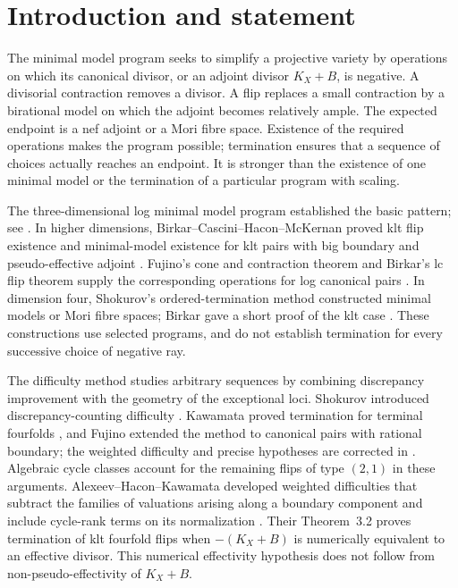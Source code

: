 \section{Introduction and statement}
\label{sec:introduction}

The minimal model program seeks to simplify a projective variety by operations
on which its canonical divisor, or an adjoint divisor $K_X+B$, is negative.
A divisorial contraction removes a divisor. A flip replaces a small
contraction by a birational model on which the adjoint becomes relatively
ample. The expected endpoint is a nef adjoint or a Mori fibre space.
Existence of the required operations makes the program possible;
termination ensures that a sequence of choices actually reaches an endpoint.
It is stronger than the existence of one minimal model or the termination
of a particular program with scaling.

The three-dimensional log minimal model program established the basic
pattern; see \cite{KollarEtAl1992,KM98}. In higher dimensions,
Birkar--Cascini--Hacon--McKernan proved klt flip existence and
minimal-model existence for klt pairs with big boundary and
pseudo-effective adjoint \cite{BCHM}.
Fujino's cone and contraction theorem and Birkar's lc flip theorem
supply the corresponding operations for log canonical pairs
\cite{FujinoFoundations,BirkarLC}. In dimension four, Shokurov's
ordered-termination method constructed minimal models or Mori fibre
spaces; Birkar gave a short proof of the klt case
\cite{ShokurovOrdered,BirkarShokurov}. These constructions use
selected programs, and do not establish termination for every
successive choice of negative ray.

The difficulty method studies arbitrary sequences by combining
discrepancy improvement with the geometry of the exceptional loci.
Shokurov introduced discrepancy-counting difficulty
\cite[Definition~2.15 and Corollaries~2.16--2.17]{Shokurov1985}.
Kawamata proved termination for terminal fourfolds
\cite{KMM87}, and Fujino extended the method to
canonical pairs with rational boundary; the weighted difficulty
and precise hypotheses are corrected in
\cite{FujinoCanonical,FujinoCanonicalAddendum}.
Algebraic cycle classes account for the remaining flips of
type $(2,1)$ in these arguments. Alexeev--Hacon--Kawamata developed
weighted difficulties that subtract the families of valuations
arising along a boundary component and include cycle-rank terms
on its normalization \cite{AHK}. Their Theorem~3.2 proves
termination of klt fourfold flips when $-(K_X+B)$ is numerically equivalent to an
effective divisor. This numerical effectivity hypothesis does
not follow from non-pseudo-effectivity of $K_X+B$.

